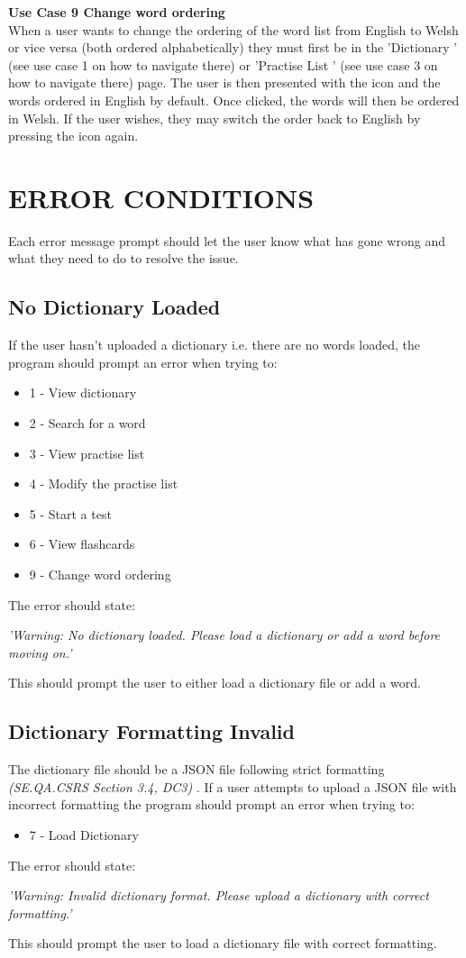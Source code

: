 \documentclass{project}
\newcommand*{\icon}[1]{%
  \raisebox{-.3\baselineskip}{%
    \texttt{[image: \#1]}%
  }%
}
\begin{document}
\textbf{Use Case 9 Change word ordering}
\\
When a user wants to change the ordering of the word list from English to Welsh or vice versa (both ordered alphabetically) they must first be in the 'Dictionary \icon{dictionary-icon}' (see use case 1 on how to navigate there) or 'Practise List \icon{practise-icon}' (see use case 3 on how to navigate there) page. The user is then presented with the \icon{order-icon} icon and the words ordered in English by default. Once clicked, the words will then be ordered in Welsh. If the user wishes, they may switch the order back to English by pressing the \icon{order-icon} icon again.
\\

\section{ERROR CONDITIONS}
Each error message prompt should let the user know what has gone wrong and what they need to do to resolve the issue.
\subsection{No Dictionary Loaded}
If the user hasn't uploaded a dictionary i.e. there are no words loaded, the program should prompt an error when trying to:
\begin{itemize}
	\item 1 - View dictionary
	\item 2 - Search for a word
	\item 3 - View practise list
	\item 4 - Modify the practise list
	\item 5 - Start a test
	\item 6 - View flashcards
	\item 9 - Change word ordering
\end{itemize}
The error should state:
\begin{center}
	\emph{'Warning: No dictionary loaded. Please load a dictionary or add a word before moving on.'}
\end{center}
This should prompt the user to either load a dictionary file or add a word.
\subsection{Dictionary Formatting Invalid}
The dictionary file should be a JSON file following strict formatting \emph{(SE.QA.CSRS Section 3.4, DC3)}\cite{se.qa.csrs} . If a user attempts to upload a JSON file with incorrect formatting the program should prompt an error when trying to:
\begin{itemize}
	\item 7 - Load Dictionary
\end{itemize}
The error should state:
\begin{center}
	\emph{'Warning: Invalid dictionary format. Please upload a dictionary with correct formatting.'}
\end{center}
This should prompt the user to load a dictionary file with correct formatting.
\end{document}

